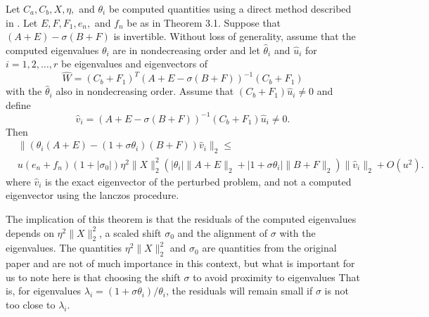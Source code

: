\begin{theorem}\label{thrm:ResidualBoundsEigenvalues}
	Let $C_a, C_b, X, \eta,$ and $\theta_i$ be computed quantities using a direct method described in \cite{stewart2024spectraltransformationdensesymmetric}. Let $E, F, F_1, e_n,$ and $f_n$ be as in Theorem 3.1. Suppose that $(A + E) - \sigma(B + F)$ is invertible. Without loss of generality, assume that the computed eigenvalues $\theta_i$ are in nondecreasing order and let $\hat{\theta}_i$ and $\hat{u}_i$ for $i = 1, 2, \dots, r$ be eigenvalues and eigenvectors of
	\[
	\hat{W} = (C_b + F_1)^{T} (A + E - \sigma(B + F))^{-1}(C_b + F_1)
	\]
	with the $\hat{\theta}_i$ also in nondecreasing order. Assume that $(C_b + F_1) \hat{u}_i \neq 0$ and define
	\[
	\hat{v}_i = (A + E - \sigma(B + F))^{-1} (C_b + F_1) \hat{u}_i \neq 0.
	\]
	 Then
	\begin{align*}
		&\|(\theta_i (A + E) - (1 + \sigma \theta_i) (B + F)) \hat{v}_i \|_2
		\leq \\
		& u (e_n + f_n)(1 + | \sigma_0 |) \eta^2 \| X \|_2^2 \left( | \theta_i | \| A + E \|_2 + | 1 + \sigma \theta_i | \| B + F \|_2 \right) \| \hat{v}_i \|_2 + O(u^2).
	\end{align*}
where $\hat{v}_i$ is the exact eigenvector of the perturbed problem, and not a computed eigenvector using the lanczos procedure.
\end{theorem}
The implication of this theorem is that the residuals of the computed eigenvalues depends on $\eta^2 \| X \|_2^2$, a scaled shift $\sigma_0$ and the alignment of $\sigma$ with the eigenvalues. The quantities $\eta^2 \| X \|_2^2$ and  $\sigma_0$  are quantities from the original paper and are not of much importance in this context, but what is important for us to note here is that choosing the shift $\sigma$ to avoid  proximity to eigenvalues  That is, for eigenvalues $\lambda_i = (1 + \sigma \theta_i)/ \theta_i$, the residuals will remain small if $\sigma$ is not too close to $\lambda_i$.

